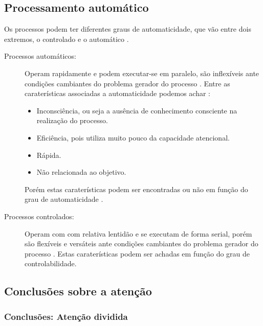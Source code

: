\subsection{Processamento automático}
Os processos podem ter diferentes graus de automaticidade,
que vão entre dois extremos, o controlado e o automático \cite[pp. 201]{eysenck2017manual}.
\begin{description}
\item[Processos automáticos:] Operam rapidamente e podem executar-se em paralelo, 
são inflexíveis ante condições cambiantes do problema gerador do processo
 \cite[pp. 198]{eysenck2017manual}.
Entre as caraterísticas associadas a automaticidade podemos achar \cite[pp. 198]{eysenck2017manual}:
\begin{itemize}
\item Inconsciência, ou seja a ausência de conhecimento consciente na realização do processo.
\item Eficiência, pois utiliza muito pouco da capacidade atencional.
\item Rápida.
\item Não relacionada ao objetivo.
\end{itemize}
Porém estas caraterísticas podem ser encontradas ou não 
em função do grau de automaticidade  \cite[pp. 198]{eysenck2017manual}.
\item[Processos controlados:] Operam com com relativa lentidão e se executam de forma serial, 
porém são flexíveis e versáteis ante condições cambiantes do problema gerador do processo
 \cite[pp. 198]{eysenck2017manual}.
Estas caraterísticas podem ser achadas em função do grau de controlabilidade.
\end{description}

\subsection{Conclusões sobre a atenção}
\label{subsec:atencaodividida}

\subsubsection{Conclusões: Atenção  dividida }

